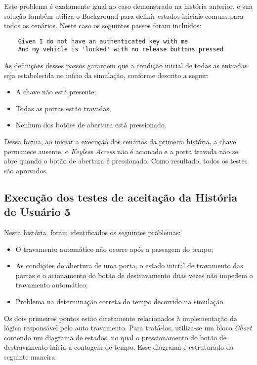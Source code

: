 Este problema é exatamente igual ao caso demonstrado na história anterior, e sua solução também utiliza o Background para definir estados iniciais comuns para todos 
os cenários. Neste caso os seguintes passos foram incluídos:

\begin{verbatim}
	Given I do not have an authenticated key with me
	And my vehicle is 'locked' with no release buttons pressed
\end{verbatim}

As definições desses passos garantem que a condição inicial de todas as entradas seja estabelecida no início da simulação, conforme descrito a seguir:

\begin{itemize}
	\item A chave não está presente;
	\item Todas as portas estão travadas;
	\item Nenhum dos botões de abertura está pressionado.
\end{itemize}

Dessa forma, ao iniciar a execução dos cenários da primeira história, a chave permanece ausente, o \textit{Keyless Access} não é acionado e a porta travada não se 
abre quando o botão de abertura é pressionado. Como resultado, todos os testes são aprovados.


\subsection{Execução dos testes de aceitação da História de Usuário 5}

Nesta história, foram identificados os seguintes problemas:

\begin{itemize}
	\item O travamento automático não ocorre após a passagem do tempo;
	\item As condições de abertura de uma porta, o estado inicial de travamento das portas e o acionamento do botão de destravamento duas vezes não impedem o travamento automático;
	\item Problema na determinação correta do tempo decorrido na simulação.
\end{itemize}

Os dois primeiros pontos estão diretamente relacionados à implementação da lógica responsável pelo auto travamento. Para tratá-los, utiliza-se um bloco \textit{Chart} 
contendo um diagrama de estados, no qual o pressionamento do botão de destravamento inicia a contagem de tempo. Esse diagrama é estruturado da seguinte maneira:

